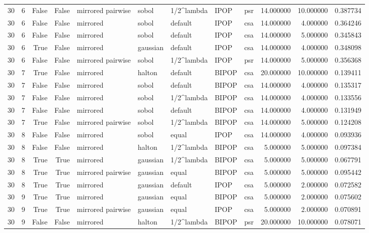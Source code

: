 \begin{tabular}{rrrrlllllrrr}
30 & 6 & False & False & mirrored pairwise & sobol & 1/2^lambda & IPOP & psr & 14.000000 & 10.000000 & 0.387734 \\
30 & 6 & False & False & mirrored & sobol & default & IPOP & csa & 14.000000 & 4.000000 & 0.364246 \\
30 & 6 & False & False & mirrored & sobol & default & IPOP & csa & 14.000000 & 5.000000 & 0.345843 \\
30 & 6 & True & False & mirrored & gaussian & default & IPOP & csa & 14.000000 & 4.000000 & 0.348098 \\
30 & 6 & False & False & mirrored pairwise & sobol & 1/2^lambda & IPOP & psr & 14.000000 & 5.000000 & 0.356368 \\
30 & 7 & True & False & mirrored & halton & default & BIPOP & csa & 20.000000 & 10.000000 & 0.139411 \\
30 & 7 & False & False & mirrored & sobol & default & BIPOP & csa & 14.000000 & 4.000000 & 0.135317 \\
30 & 7 & False & False & mirrored & sobol & 1/2^lambda & BIPOP & csa & 14.000000 & 4.000000 & 0.133556 \\
30 & 7 & False & False & mirrored & sobol & default & BIPOP & csa & 14.000000 & 4.000000 & 0.131949 \\
30 & 7 & True & False & mirrored pairwise & sobol & 1/2^lambda & BIPOP & csa & 14.000000 & 5.000000 & 0.124208 \\
30 & 8 & False & False & mirrored & sobol & equal & IPOP & csa & 14.000000 & 4.000000 & 0.093936 \\
30 & 8 & False & False & mirrored & halton & 1/2^lambda & BIPOP & csa & 5.000000 & 5.000000 & 0.097384 \\
30 & 8 & True & True & mirrored & gaussian & 1/2^lambda & BIPOP & csa & 5.000000 & 5.000000 & 0.067791 \\
30 & 8 & True & True & mirrored pairwise & gaussian & equal & BIPOP & csa & 5.000000 & 5.000000 & 0.095442 \\
30 & 8 & True & True & mirrored & gaussian & default & IPOP & csa & 5.000000 & 2.000000 & 0.072582 \\
30 & 9 & True & True & mirrored & gaussian & equal & BIPOP & csa & 5.000000 & 2.000000 & 0.075602 \\
30 & 9 & True & True & mirrored pairwise & gaussian & equal & IPOP & csa & 5.000000 & 2.000000 & 0.070891 \\
30 & 9 & False & False & mirrored & halton & 1/2^lambda & BIPOP & psr & 20.000000 & 10.000000 & 0.078071 \\

\end{tabular}
